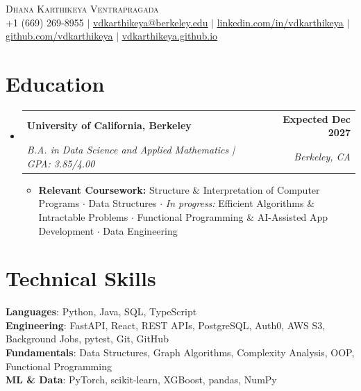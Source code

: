 \documentclass[letterpaper,11pt]{article}
\makeatletter
\newcommand{\resumeItem}[1]{
  \item\small{
    {#1 \vspace{-2pt}}
  }
}
\newcommand{\resumeSubheading}[4]{
  \vspace{-2pt}\item
    \begin{tabular*}{1.0\textwidth}[t]{l@{\extracolsep{\fill}}r}
      \textbf{#1} & \textbf{\small #2} \\
      \textit{\small#3} & \textit{\small #4} \\
    \end{tabular*}\vspace{-7pt}
}
\newcommand{\resumeSubHeadingListStart}{\begin{itemize}[leftmargin=0.0in, label={}]}
\newcommand{\resumeSubHeadingListEnd}{\end{itemize}}
\newcommand{\resumeItemListStart}{\begin{itemize}[itemsep=2.5pt, topsep=3pt]}
\newcommand{\resumeItemListEnd}{\end{itemize}\vspace{-4pt}}
\makeatother
\begin{document}
\begin{center}
    {\Huge \scshape Dhana Karthikeya Ventrapragada} \\ \vspace{1pt}
        \footnotesize
    +1 (669) 269-8955 $|$
    \href{mailto:vdkarthikeya@berkeley.edu}{\uline{vdkarthikeya@berkeley.edu}} $|$
    \href{https://www.linkedin.com/in/vdkarthikeya/}{\uline{linkedin.com/in/vdkarthikeya}} $|$
    \href{https://github.com/vdkarthikeya}{\uline{github.com/vdkarthikeya}} $|$
    \href{https://vdkarthikeya.github.io}{\uline{vdkarthikeya.github.io}}
    \vspace{-8pt}
\end{center}

\section{Education}
\resumeSubHeadingListStart

\resumeSubheading
{University of California, Berkeley}{Expected Dec 2027}
{B.A. in Data Science and Applied Mathematics \;|\; GPA: 3.85/4.00}{Berkeley, CA}

\vspace{-6pt}
\resumeItemListStart
\resumeItem{\textbf{Relevant Coursework:} Structure \& Interpretation of Computer Programs $\cdot$ Data Structures $\cdot$ \textit{In progress:} Efficient Algorithms \& Intractable Problems $\cdot$ Functional Programming \& AI-Assisted App Development $\cdot$ Data Engineering}
\resumeItemListEnd
\resumeSubHeadingListEnd
\vspace{-14pt}

\section{Technical Skills}
 \begin{itemize}[leftmargin=0.15in, label={}, itemsep=3pt]
    \small{\item{
     \textbf{Languages}{: Python, Java, SQL, TypeScript} \\[2pt]
     \textbf{Engineering}{: FastAPI, React, REST APIs, PostgreSQL, Auth0, AWS S3, Background Jobs, pytest, Git, GitHub} \\[2pt]
     \textbf{Fundamentals}{: Data Structures, Graph Algorithms, Complexity Analysis, OOP, Functional Programming} \\[2pt]
     \textbf{ML \& Data}{: PyTorch, scikit-learn, XGBoost, pandas, NumPy}
    }}
 \end{itemize}
 \vspace{-15pt}
\end{document}
